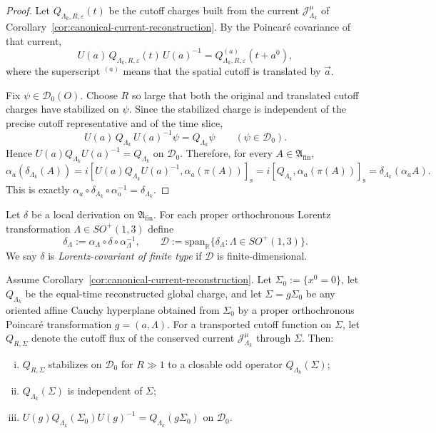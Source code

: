 \begin{proof}
Let \(Q_{\Lambda_k,R,\varepsilon}(t)\) be the cutoff charges built from the current
\(\mathcal J^\mu_{\Lambda_k}\) of
Corollary~\ref{cor:canonical-current-reconstruction}.
By the Poincar\'e covariance of that current,
\[
U(a)\,Q_{\Lambda_k,R,\varepsilon}(t)\,U(a)^{-1}
=
Q_{\Lambda_k,R,\varepsilon}^{(a)}(t+a^0),
\]
where the superscript \({}^{(a)}\) means that the spatial cutoff is translated by
\(\vec a\).

Fix \(\psi\in\mathcal D_0(O)\). Choose \(R\) so large that both the original and
translated cutoff charges have stabilized on \(\psi\). Since the stabilized charge is
independent of the precise cutoff representative and of the time slice,
\[
U(a)\,Q_{\Lambda_k}\,U(a)^{-1}\psi
=
Q_{\Lambda_k}\psi
\qquad(\psi\in\mathcal D_0).
\]
Hence \(U(a)Q_{\Lambda_k}U(a)^{-1}=Q_{\Lambda_k}\) on \(\mathcal D_0\). Therefore, for
every \(A\in\mathfrak A_{\mathrm{fin}}\),
\[
\alpha_a(\delta_{\Lambda_k}(A))
=
i[U(a)Q_{\Lambda_k}U(a)^{-1},\alpha_a(\pi(A))]_{\mathrm s}
=
i[Q_{\Lambda_k},\alpha_a(\pi(A))]_{\mathrm s}
=
\delta_{\Lambda_k}(\alpha_a A).
\]
This is exactly
\(
\alpha_a\circ\delta_{\Lambda_k}\circ\alpha_a^{-1}=\delta_{\Lambda_k}.
\)
\end{proof}

\begin{definition}
\label{def:delta-family}
Let $\delta$ be a local derivation on $\mathfrak A_{\mathrm{fin}}$. For each
proper orthochronous Lorentz transformation $\Lambda\in SO^+(1,3)$ define
\[
\delta_\Lambda:=\alpha_\Lambda\circ\delta\circ\alpha_\Lambda^{-1},
\qquad
\mathscr D:=\mathrm{span}_{\mathbb R}\{\delta_\Lambda:\Lambda\in SO^+(1,3)\}.
\]
We say $\delta$ is \emph{Lorentz-covariant of finite type} if $\mathscr D$ is
finite-dimensional.
\end{definition}

\begin{lemma}
\label{lem:delta-hyperplane-charge}
Assume Corollary~\ref{cor:canonical-current-reconstruction}. Let
\(\Sigma_0:=\{x^0=0\}\), let \(Q_{\Lambda_k}\) be the equal-time reconstructed global
charge, and let \(\Sigma=g\Sigma_0\) be any oriented affine Cauchy hyperplane
obtained from \(\Sigma_0\) by a proper orthochronous Poincar\'e transformation
\(g=(a,\Lambda)\). For a transported cutoff function on \(\Sigma\), let
\(Q_{R,\Sigma}\) denote the cutoff flux of the conserved current
\(\mathcal J^\mu_{\Lambda_k}\) through \(\Sigma\). Then:
\begin{enumerate}[(i)]
\item \(Q_{R,\Sigma}\) stabilizes on \(\mathcal D_0\) for \(R\gg 1\) to a closable odd
      operator \(Q_{\Lambda_k}(\Sigma)\);
\item \(Q_{\Lambda_k}(\Sigma)\) is independent of \(\Sigma\);
\item \(U(g)Q_{\Lambda_k}(\Sigma_0)U(g)^{-1}=Q_{\Lambda_k}(g\Sigma_0)\) on
      \(\mathcal D_0\).
\end{enumerate}
\end{lemma}

